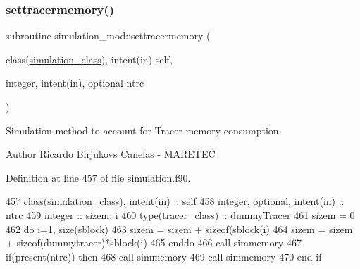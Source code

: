 \subsubsection{\texorpdfstring{settracermemory()}{settracermemory()}}
{\footnotesize\ttfamily subroutine simulation\+\_\+mod\+::settracermemory (\begin{DoxyParamCaption}\item[{class(\mbox{\hyperlink{structsimulation__mod_1_1simulation__class}{simulation\+\_\+class}}), intent(in)}]{self,  }\item[{integer, intent(in), optional}]{ntrc }\end{DoxyParamCaption})\hspace{0.3cm}{\ttfamily [private]}}



Simulation method to account for Tracer memory consumption. 

\begin{DoxyAuthor}{Author}
Ricardo Birjukovs Canelas -\/ M\+A\+R\+E\+T\+EC 
\end{DoxyAuthor}


Definition at line 457 of file simulation.\+f90.


\begin{DoxyCode}
457     \textcolor{keywordtype}{class}(simulation\_class), \textcolor{keywordtype}{intent(in)} :: self
458     \textcolor{keywordtype}{integer}, \textcolor{keywordtype}{optional}, \textcolor{keywordtype}{intent(in)} :: ntrc
459     \textcolor{keywordtype}{integer} :: sizem, i
460     \textcolor{keywordtype}{type}(tracer\_class) :: dummyTracer
461     sizem = 0
462     \textcolor{keywordflow}{do} i=1, \textcolor{keyword}{size}(sblock)
463         sizem = sizem + sizeof(sblock(i)%
464         sizem = sizem + sizeof(dummytracer)*sblock(i)%
465 \textcolor{keywordflow}{    enddo}
466     \textcolor{keyword}{call }simmemory%
467     \textcolor{keywordflow}{if}(\textcolor{keyword}{present}(ntrc)) \textcolor{keywordflow}{then}
468         \textcolor{keyword}{call }simmemory%
469         \textcolor{keyword}{call }simmemory%
470 \textcolor{keywordflow}{    end if}
\end{DoxyCode}
\mbox{\label{namespacesimulation__mod_a87a5141e4516b9610a6e4f0d2ff2d719}} 

